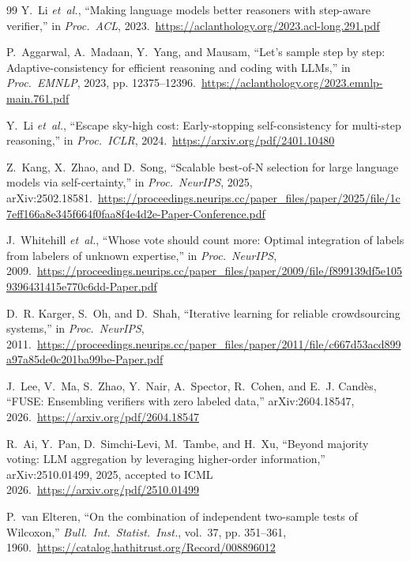 \documentclass[conference]{IEEEtran}
\begin{document}
\begin{thebibliography}{99}
Y.~Li \emph{et~al.}, ``Making language models better reasoners with step-aware verifier,'' in \emph{Proc.\ ACL}, 2023.\ \url{https://aclanthology.org/2023.acl-long.291.pdf}

P.~Aggarwal, A.~Madaan, Y.~Yang, and Mausam, ``Let's sample step by step: Adaptive-consistency for efficient reasoning and coding with {LLMs},'' in \emph{Proc.\ EMNLP}, 2023, pp. 12375--12396.\ \url{https://aclanthology.org/2023.emnlp-main.761.pdf}

Y.~Li \emph{et~al.}, ``Escape sky-high cost: Early-stopping self-consistency for multi-step reasoning,'' in \emph{Proc.\ ICLR}, 2024.\ \url{https://arxiv.org/pdf/2401.10480}

Z.~Kang, X.~Zhao, and D.~Song, ``Scalable best-of-N selection for large language models via self-certainty,'' in \emph{Proc.\ NeurIPS}, 2025, arXiv:2502.18581.\ \url{https://proceedings.neurips.cc/paper_files/paper/2025/file/1c7eff166a8e345f664f0faa8f4e4d2e-Paper-Conference.pdf}

J.~Whitehill \emph{et~al.}, ``Whose vote should count more: Optimal integration of labels from labelers of unknown expertise,'' in \emph{Proc.\ NeurIPS}, 2009.\ \url{https://proceedings.neurips.cc/paper_files/paper/2009/file/f899139df5e1059396431415e770c6dd-Paper.pdf}

D.~R. Karger, S.~Oh, and D.~Shah, ``Iterative learning for reliable crowdsourcing systems,'' in \emph{Proc.\ NeurIPS}, 2011.\ \url{https://proceedings.neurips.cc/paper_files/paper/2011/file/c667d53acd899a97a85de0c201ba99be-Paper.pdf}

J.~Lee, V.~Ma, S.~Zhao, Y.~Nair, A.~Spector, R.~Cohen, and E.~J. Cand\`es, ``FUSE: Ensembling verifiers with zero labeled data,'' arXiv:2604.18547, 2026.\ \url{https://arxiv.org/pdf/2604.18547}

R.~Ai, Y.~Pan, D.~Simchi-Levi, M.~Tambe, and H.~Xu, ``Beyond majority voting: LLM aggregation by leveraging higher-order information,'' arXiv:2510.01499, 2025, accepted to ICML 2026.\ \url{https://arxiv.org/pdf/2510.01499}

P.~van Elteren, ``On the combination of independent two-sample tests of Wilcoxon,'' \emph{Bull.\ Int.\ Statist.\ Inst.}, vol.~37, pp. 351--361, 1960.\ \url{https://catalog.hathitrust.org/Record/008896012}


\end{thebibliography}
\end{document}
